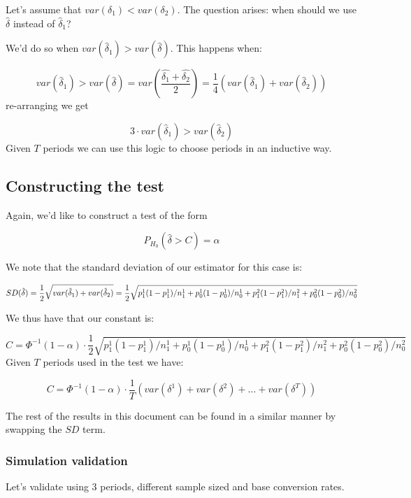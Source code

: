 \documentclass[
]{article}
\begin{document}
Let's assume that \(var(\delta_1)<var(\delta_2)\). The question arises:
when should we use \(\hat{\delta}\) instead of \(\hat{\delta}_1\)?

We'd do so when \(var(\hat{\delta}_1) > var(\hat{\delta})\). This
happens when:

\[var(\hat{\delta}_1) > var(\hat{\delta}) = var\left(\frac{\hat{\delta_1} + \hat{\delta_2}}{2}\right) = \frac{1}{4}\left(var(\hat{\delta}_1) + var(\hat{\delta}_2)\right)\]
re-arranging we get

\[3\cdot var(\hat{\delta}_1) > var(\hat{\delta}_2)\] Given \(T\) periods
we can use this logic to choose periods in an inductive way.

\hypertarget{constructing-the-test-1}{%
\subsection{Constructing the test}\label{constructing-the-test-1}}

Again, we'd like to construct a test of the form

\[P_{H_0}(\hat{\delta} > C) = \alpha\]

We note that the standard deviation of our estimator for this case is:

\[SD(\hat{\delta}) = \frac{1}{2}\sqrt{var(\hat{\delta}_1) + var(\hat{\delta}_2)} = \\ \frac{1}{2}\sqrt{p_1^1(1-p_1^1)/n_1^1 + p_0^1(1-p_0^1)/n_0^1 + p_1^2(1 - p_1^2)/n_1^2 + p_0^2(1-p_0^2)/n_0^2}\]

We thus have that our constant is:

\[\boxed{C = \Phi^{-1}(1 - \alpha) \cdot \frac{1}{2}\sqrt{p_1^1(1-p_1^1)/n_1^1 + p_0^1(1-p_0^1)/n_0^1 + p_1^2(1 - p_1^2)/n_1^2 + p_0^2(1-p_0^2)/n_0^2}}\]
Given \(T\) periods used in the test we have:

\[\boxed{C = \Phi^{-1}(1 - \alpha) \cdot \frac{1}{T}\left(var(\delta^1) + var(\delta^2) + \dots + var(\delta^T)\right)}\]

The rest of the results in this document can be found in a similar
manner by swapping the \(SD\) term.

\hypertarget{simulation-validation-5}{%
\subsubsection{Simulation validation}\label{simulation-validation-5}}

Let's validate using 3 periods, different sample sized and base
conversion rates.
\end{document}
